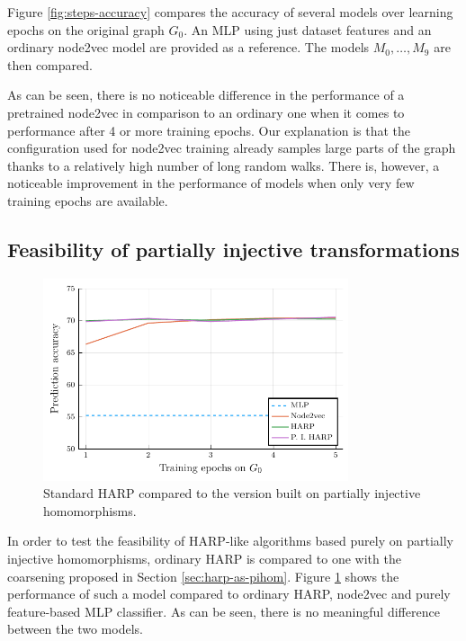 Figure \ref{fig:steps-accuracy} compares the accuracy of several models over learning epochs on the original graph \( G_0 \). An MLP using just dataset features and an ordinary node2vec model are provided as a reference. The models \( M_0, \dots, M_9 \) are then compared.

As can be seen, there is no noticeable difference in the performance of a pretrained node2vec in comparison to an ordinary one when it comes to performance after 4 or more training epochs. Our explanation is that the configuration used for node2vec training already samples large parts of the graph thanks to a relatively high number of long random walks. There is, however, a noticeable improvement in the performance of models when only very few training epochs are available.

\subsection{Feasibility of partially injective transformations}\label{sec:harp-vs-pihom}

\begin{figure}
  \centering
  \includegraphics[width=0.8\textwidth]{images/pihom_comparison/pihom_comparison.pdf}
  \caption{Standard HARP compared to the version built on partially injective homomorphisms.}\label{fig:HARP-vs-PIHom}
\end{figure}

In order to test the feasibility of HARP-like algorithms based purely on partially injective homomorphisms, ordinary HARP is compared to one with the coarsening proposed in Section \ref{sec:harp-as-pihom}. Figure \ref{fig:HARP-vs-PIHom} shows the performance of such a model compared to ordinary HARP, node2vec and purely feature-based MLP classifier. As can be seen, there is no meaningful difference between the two models.
